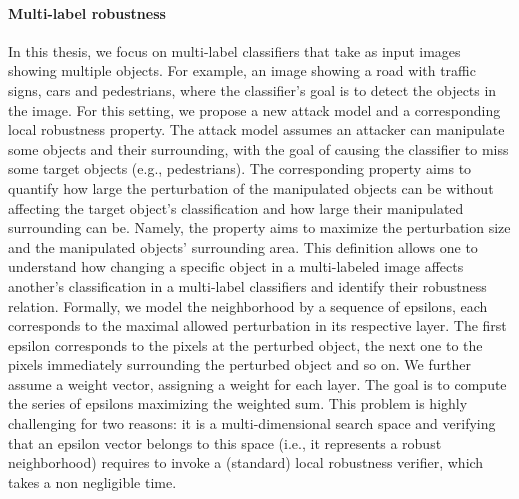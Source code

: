 \paragraph{Multi-label robustness}
In this thesis, we focus on multi-label classifiers that take as input images showing multiple objects. For example, an image showing a road with traffic signs, cars and pedestrians, where the classifier's goal is to detect the objects in the image. 
For this setting, we propose a new attack model and a corresponding local robustness property. The attack model assumes an attacker can manipulate some objects and their surrounding, with the goal of causing the classifier to miss some target objects (e.g., pedestrians).
 The corresponding property aims to quantify how large the perturbation of the manipulated objects can be without affecting the target object's classification and how large their manipulated surrounding can be. 
  Namely, the property aims to maximize the perturbation size and the manipulated objects' surrounding area.
This definition allows one to understand how changing a specific object in a multi-labeled image affects another's classification in a multi-label classifiers and identify their robustness relation.
Formally, we model the neighborhood by a sequence of epsilons, each corresponds to the maximal allowed perturbation in its respective layer. The first epsilon corresponds to the pixels at the perturbed object, the next one to the pixels immediately surrounding the perturbed object and so on. %
We further assume a weight vector, assigning a weight for each layer. The goal is to compute the series of epsilons maximizing the weighted sum.
This problem is highly challenging for two reasons: 
it is a multi-dimensional search space and verifying that an epsilon vector belongs to this space (i.e., it represents a robust neighborhood) requires to invoke a (standard) local robustness verifier, which takes a non negligible time. 

